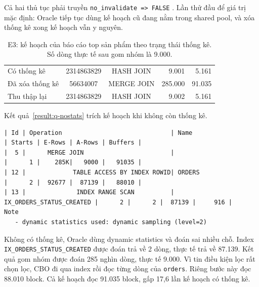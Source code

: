 Cả hai thủ tục phải truyền \texttt{no\_invalidate => FALSE} \cite{qOracleStats}. Lần thử đầu để giá trị mặc định: Oracle tiếp tục dùng kế hoạch cũ đang nằm trong shared pool, và xóa thống kê xong kế hoạch vẫn y nguyên.

\begin{table}[!htbp]
\centering
\caption{E3: kế hoạch của báo cáo top sản phẩm theo trạng thái thống kê. Số dòng thực tế sau gom nhóm là 9.000.}\label{tab:q-stats}
\reporttablesetup
\begin{tabularx}{\linewidth}{|L|c|c|r|r|}
\hline
{}
 &  &  &  &  \\ \hline
Có thống kê & 2314863829 & HASH JOIN & 9.001 & 5.161 \\ \hline
Đã xóa thống kê & 56634007 & MERGE JOIN & 285.000 & 91.035 \\ \hline
Thu thập lại & 2314863829 & HASH JOIN & 9.002 & 5.161 \\ \hline
\end{tabularx}
\end{table}

Kết quả~\ref{result:q-nostats} trích kế hoạch khi không còn thống kê.

\reportblockspace{72pt}
\begingroup
{}\label{result:q-nostats}
\nopagebreak[4]
\begin{Verbatim}[fontsize=\scriptsize]
| Id | Operation                              | Name                     | Starts | E-Rows | A-Rows | Buffers |
|  5 |      MERGE JOIN                        |                          |      1 |    285K|   9000 |   91035 |
| 12 |             TABLE ACCESS BY INDEX ROWID| ORDERS                   |      2 |  92677 |  87139 |   88010 |
| 13 |              INDEX RANGE SCAN          | IX_ORDERS_STATUS_CREATED |      2 |      2 |  87139 |     916 |
Note
   - dynamic statistics used: dynamic sampling (level=2)
\end{Verbatim}
\endgroup\par\smallskip

Không có thống kê, Oracle dùng dynamic statistics và đoán sai nhiều chỗ. Index \texttt{IX\_ORDERS\_STATUS\_CREATED} được đoán trả về 2 dòng, thực tế trả về 87.139. Kết quả gom nhóm được đoán 285 nghìn dòng, thực tế 9.000. Vì tin điều kiện lọc rất chọn lọc, CBO đi qua index rồi đọc từng dòng của \texttt{orders}. Riêng bước này đọc 88.010 block. Cả kế hoạch đọc 91.035 block, gấp 17,6 lần kế hoạch có thống kê.

